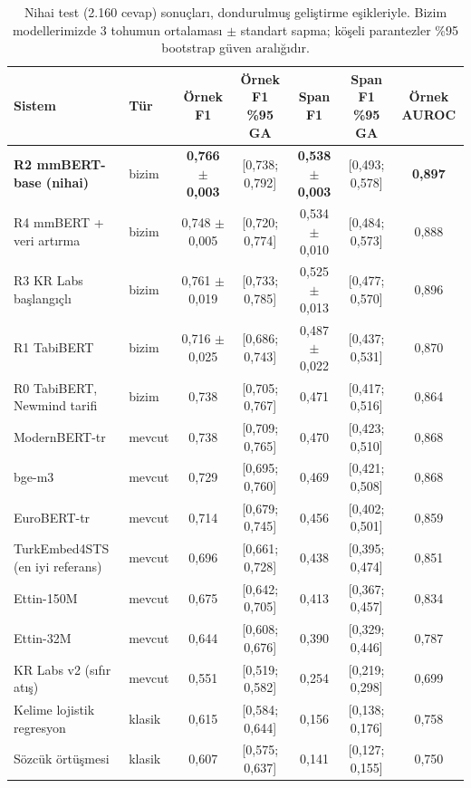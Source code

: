 \documentclass[conference,a4paper]{IEEEtran}
\begin{document}
\begin{table}[t]
\centering
\caption{Nihai test (2.160 cevap) sonuçları, dondurulmuş geliştirme eşikleriyle. Bizim modellerimizde 3 tohumun ortalaması $\pm$ standart sapma; köşeli parantezler \%95 bootstrap güven aralığıdır.}
\label{tab:main}
\footnotesize
\begin{tabular}{@{}llccccc@{}}
\toprule
Sistem & Tür & Örnek F1 & Örnek F1 \%95 GA & Span F1 & Span F1 \%95 GA & Örnek AUROC \\
\midrule
\textbf{R2 mmBERT-base (nihai)} & bizim & \textbf{0,766 $\pm$ 0,003} & [0,738; 0,792] & \textbf{0,538 $\pm$ 0,003} & [0,493; 0,578] & \textbf{0,897} \\
R4 mmBERT + veri artırma & bizim & 0,748 $\pm$ 0,005 & [0,720; 0,774] & 0,534 $\pm$ 0,010 & [0,484; 0,573] & 0,888 \\
R3 KR Labs başlangıçlı & bizim & 0,761 $\pm$ 0,019 & [0,733; 0,785] & 0,525 $\pm$ 0,013 & [0,477; 0,570] & 0,896 \\
R1 TabiBERT & bizim & 0,716 $\pm$ 0,025 & [0,686; 0,743] & 0,487 $\pm$ 0,022 & [0,437; 0,531] & 0,870 \\
R0 TabiBERT, Newmind tarifi & bizim & 0,738 & [0,705; 0,767] & 0,471 & [0,417; 0,516] & 0,864 \\
\midrule
ModernBERT-tr & mevcut & 0,738 & [0,709; 0,765] & 0,470 & [0,423; 0,510] & 0,868 \\
bge-m3 & mevcut & 0,729 & [0,695; 0,760] & 0,469 & [0,421; 0,508] & 0,868 \\
EuroBERT-tr & mevcut & 0,714 & [0,679; 0,745] & 0,456 & [0,402; 0,501] & 0,859 \\
TurkEmbed4STS (en iyi referans) & mevcut & 0,696 & [0,661; 0,728] & 0,438 & [0,395; 0,474] & 0,851 \\
Ettin-150M & mevcut & 0,675 & [0,642; 0,705] & 0,413 & [0,367; 0,457] & 0,834 \\
Ettin-32M & mevcut & 0,644 & [0,608; 0,676] & 0,390 & [0,329; 0,446] & 0,787 \\
KR Labs v2 (sıfır atış) & mevcut & 0,551 & [0,519; 0,582] & 0,254 & [0,219; 0,298] & 0,699 \\
\midrule
Kelime lojistik regresyon & klasik & 0,615 & [0,584; 0,644] & 0,156 & [0,138; 0,176] & 0,758 \\
Sözcük örtüşmesi & klasik & 0,607 & [0,575; 0,637] & 0,141 & [0,127; 0,155] & 0,750 \\
\bottomrule
\end{tabular}
\end{table}
\end{document}
